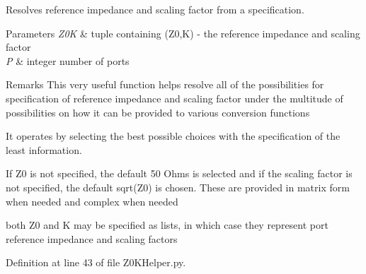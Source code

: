 Resolves reference impedance and scaling factor from a specification. 


\begin{DoxyParams}{Parameters}
{\em Z0K} & tuple containing (Z0,K) -\/ the reference impedance and scaling factor \\
\hline
{\em P} & integer number of ports \\
\hline
\end{DoxyParams}
\begin{DoxyRemark}{Remarks}
This very useful function helps resolve all of the possibilities for specification of reference impedance and scaling factor under the multitude of possibilities on how it can be provided to various conversion functions
\end{DoxyRemark}
It operates by selecting the best possible choices with the specification of the least information.

If Z0 is not specified, the default 50 Ohms is selected and if the scaling factor is not specified, the default sqrt(\+Z0) is chosen. These are provided in matrix form when needed and complex when needed

both Z0 and K may be specified as lists, in which case they represent port reference impedance and scaling factors 

Definition at line 43 of file Z0\+K\+Helper.\+py.

